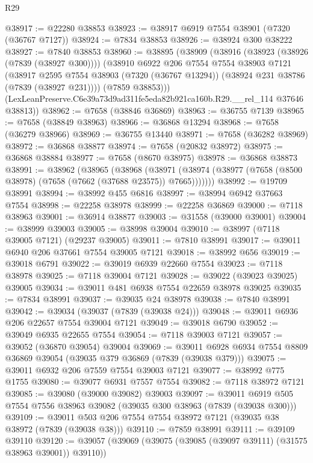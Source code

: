 \begin{lexlean}{R29}
\begin{coremodule}
@38917 := @22280 @38853
@38923 := @38917 @6919 @7554 @38901 (@7320 (@36767 @7127))
@38924 := @7834 @38853
@38926 := @38924 @300 @38222
@38927 := @7840 @38853
@38960 := @38895
    (@38909
      (@38916
        (@38923 (@38926 (@7839 (@38927 @300))))
        (@38910
          @6922
          @206
          @7554
          @7554
          @38903
          @7121
          (@38917
            @2595
            @7554
            @38903
            (@7320 (@36767 @13294))
            (@38924 @231 @38786 (@7839 (@38927 @231))))
          (@7859 @38853)))
      (LexLeanPreserve.C6e39a73d9ad311fe5eda82b921ca160b.R29.__rel_114 @37646 @38813))
@38962 := @7658 (@38846 @36869)
@38963 := @36755 @7139
@38965 := @7658 (@38849 @38963)
@38966 := @36868 @13294
@38968 := @7658 (@36279 @38966)
@38969 := @36755 @13440
@38971 := @7658 (@36282 @38969)
@38972 := @36868 @38877
@38974 := @7658 (@20832 @38972)
@38975 := @36868 @38884
@38977 := @7658 (@8670 @38975)
@38978 := @36868 @38873
@38991 := @38962
    (@38965
      (@38968
        (@38971 (@38974 (@38977 (@7658 (@8500 @38978) (@7658 (@7662 (@37688 @23575)) @7665)))))))
@38992 := @19709 @38991
@38994 := @38992 @455 @6816
@38997 := @38994 @6942 @37663 @7554
@38998 := @22258 @38978
@38999 := @22258 @36869
@39000 := @7118 @38963
@39001 := @36914 @38877
@39003 := @31558 (@39000 @39001)
@39004 := @38999 @39003
@39005 := @38998 @39004
@39010 := @38997 (@7118 @39005 @7121) (@29237 @39005)
@39011 := @7810 @38991
@39017 := @39011 @6940 @206 @37661 @7554 @39005 @7121
@39018 := @38992 @656
@39019 := @39018 @6791
@39022 := @39019 @6939 @22660 @7554
@39023 := @7118 @38978
@39025 := @7118 @39004 @7121
@39028 := @39022 (@39023 @39025) @39005
@39034 := @39011 @481 @6938 @7554 @22659 @38978 @39025
@39035 := @7834 @38991
@39037 := @39035 @24 @38978
@39038 := @7840 @38991
@39042 := @39034 (@39037 (@7839 (@39038 @24)))
@39048 := @39011 @6936 @206 @22657 @7554 @39004 @7121
@39049 := @39018 @6790
@39052 := @39049 @6935 @22655 @7554
@39054 := @7118 @39003 @7121
@39057 := @39052 (@36870 @39054) @39004
@39069 := @39011 @6928 @6934 @7554 @8809 @36869 @39054 (@39035 @379 @36869 (@7839 (@39038 @379)))
@39075 := @39011 @6932 @206 @7559 @7554 @39003 @7121
@39077 := @38992 @775 @1755
@39080 := @39077 @6931 @7557 @7554
@39082 := @7118 @38972 @7121
@39085 := @39080 (@39000 @39082) @39003
@39097 := @39011 @6919 @505 @7554 @7556 @38963 @39082 (@39035 @300 @38963 (@7839 (@39038 @300)))
@39109 := @39011 @503 @206 @7554 @7554 @38972 @7121 (@39035 @38 @38972 (@7839 (@39038 @38)))
@39110 := @7859 @38991
@39111 := @39109 @39110
@39120 := @39057 (@39069 (@39075 (@39085 (@39097 @39111) (@31575 @38963 @39001)) @39110))

\end{coremodule}
\end{lexlean}
